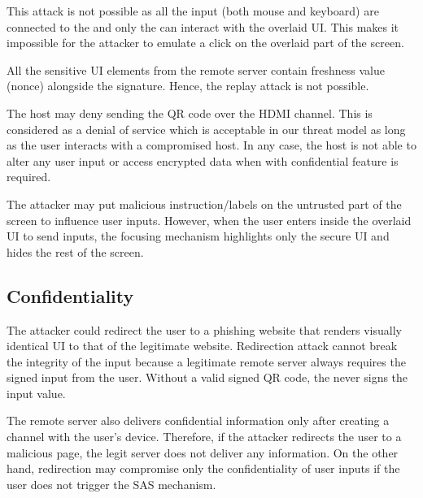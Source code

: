  This attack is not possible as all the input (both mouse and keyboard) are connected to the \device and only the \device can interact with the overlaid UI. This makes it impossible for the attacker to emulate a click on the overlaid part of the screen.  

 All the sensitive UI elements from the remote server contain freshness value (nonce) alongside the signature. Hence, the replay attack is not possible.

 The host may deny sending the QR code over the HDMI channel. This is considered as a denial of service which is acceptable in our threat model as long as the user interacts with a compromised host. 
In any case, the host is not able to alter any user input or access encrypted data when \name with confidential feature is required.

 The attacker may put malicious instruction/labels on the untrusted part of the screen to influence user inputs. However, when the user enters inside the overlaid UI to send inputs, the focusing mechanism highlights only the secure UI and hides the rest of the screen. 

\subsection{Confidentiality}

 The attacker could redirect the user to a phishing website that renders visually identical UI to that of the legitimate website. Redirection attack cannot break the integrity of the input because a legitimate remote server always requires the signed input from the user. Without a valid signed QR code, the \device never signs the input value. 

The remote server also delivers confidential information only after creating a \tls channel with the user's device. Therefore, if the attacker redirects the user to a malicious page, the legit server does not deliver any information. On the other hand, redirection may compromise only the confidentiality of user inputs if the user does not trigger the SAS mechanism. 

